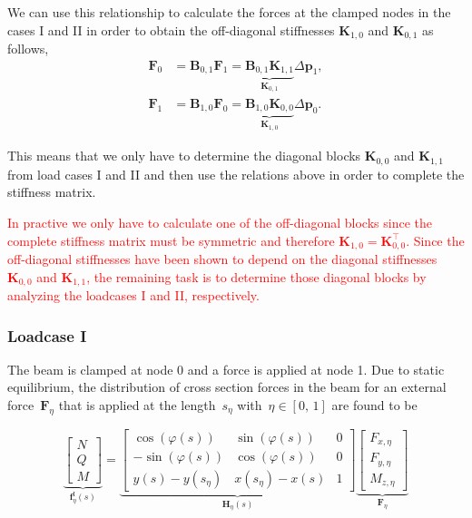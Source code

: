 We can use this relationship to calculate the forces at the clamped nodes in the cases I and II in order to obtain the off-diagonal stiffnesses $\boldsymbol{K}_{1,0}$ and $\boldsymbol{K}_{0,1}$ as follows,
%
\begin{align}
\boldsymbol{F}_0 &= \boldsymbol{B}_{0,1}\boldsymbol{F}_1 = \underbrace{\boldsymbol{B}_{0,1}\boldsymbol{K}_{1,1}}_{\boldsymbol{K}_{0,1}}\Delta\boldsymbol{p}_1, \\
\boldsymbol{F}_1 &= \boldsymbol{B}_{1,0}\boldsymbol{F}_0 = \underbrace{\boldsymbol{B}_{1,0}\boldsymbol{K}_{0,0}}_{\boldsymbol{K}_{1,0}}\Delta\boldsymbol{p}_0.
\end{align}

This means that we only have to determine the diagonal blocks $\boldsymbol{K}_{0,0}$ and $\boldsymbol{K}_{1,1}$ from load cases I and II and then use the relations above in order to complete the stiffness matrix.

\textcolor{red}{
In practive we only have to calculate one of the off-diagonal blocks since the complete stiffness matrix must be symmetric and therefore $\boldsymbol{K}_{1,0} = \boldsymbol{K}_{0,0}^\intercal$.
Since the off-diagonal stiffnesses have been shown to depend on the diagonal stiffnesses $\boldsymbol{K}_{0,0}$ and $\boldsymbol{K}_{1,1}$, the remaining task is to determine those diagonal blocks by analyzing the loadcases I and II, respectively.
}

\subsubsection*{Loadcase I}

The beam is clamped at node 0 and a force is applied at node 1.
Due to static equilibrium, the distribution of cross section forces in the beam for an external force~$\boldsymbol{F}_\eta$ that is applied at the length~$s_\eta$ with~$\eta \in [0,\,1]$ are found to be

\begin{equation}
\underbrace{
\begin{bmatrix}
N \\ Q \\ M
\end{bmatrix}
}_{\boldsymbol{f}^{\mathrm{I}}_{\eta}(s)}
=
\underbrace{
\begin{bmatrix}
\cos(\varphi(s)) & \sin(\varphi(s)) & 0 \\
-\sin(\varphi(s)) & \cos(\varphi(s)) & 0 \\
y(s) - y(s_\eta) & x(s_\eta) - x(s) & 1
\end{bmatrix}
}_{\boldsymbol{H}_{\eta}(s)}
\underbrace{
\begin{bmatrix}
F_{x,\eta} \\ F_{y,\eta} \\ M_{z,\eta}
\end{bmatrix}
}_{\boldsymbol{F}_\eta} \label{eq:section-static-equilibrium}
\end{equation}


